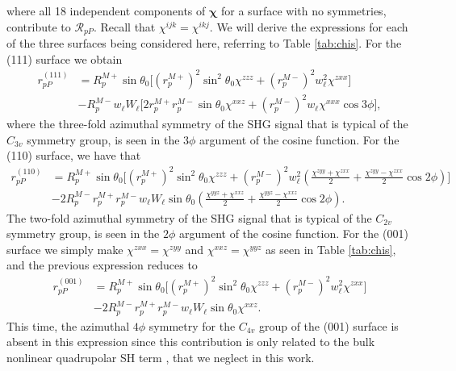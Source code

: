 where all 18 independent components of $\boldsymbol{\chi}$ for a surface with no
symmetries, contribute to $\mathcal{R}_{pP}$. Recall that $\chi^{ijk} =
\chi^{ikj}$. We will derive  the expressions for each of the three surfaces
being considered here, referring to Table \ref{tab:chis}. For the (111) surface we
obtain
\begin{equation}\label{eq:rpp111}
\begin{split}
r^{(111)}_{pP} &= 
R^{M+}_{p}\sin\theta_{0}
\Big[
  \left(r^{M+}_{p}\right)^{2}\sin^{2}\theta_{0}\chi^{zzz}
+ \left(r^{M-}_{p}\right)^{2}w^{2}_{\ell}\chi^{zxx}
\Big]\\
&- R^{M-}_{p}w_{\ell}W_{\ell}
\Big[
  2r^{M+}_{p}r^{M-}_{p}\sin\theta_{0}\chi^{xxz}
+ \left(r^{M-}_{p}\right)^{2}w_{\ell}\chi^{xxx}\cos3\phi
\Big],
\end{split}
\end{equation}
where the three-fold azimuthal symmetry of the SHG signal that is typical of the
$C_{3v}$ symmetry group, is seen in the $3\phi$ argument of the cosine function.
For the (110) surface, we have that
\begin{equation}\label{eq:rpp110}
\begin{split}
r^{(110)}_{pP} &= 
R^{M+}_{p}\sin\theta_{0}
\Bigg[
  \left(r^{M+}_{p}\right)^{2}\sin^{2}\theta_{0}\chi^{zzz}
+ \left(r^{M-}_{p}\right)^{2}w^{2}_{\ell}
\left(
\frac{\chi^{zyy} + \chi^{zxx}}{2} + \frac{\chi^{zyy} - \chi^{zxx}}{2}\cos2\phi 
\right) 
\Bigg]\\
&- 2R^{M-}_{p}r^{M+}_{p}r^{M-}_{p}w_{\ell}W_{\ell}\sin\theta_{0}
\left(
\frac{\chi^{yyz} + \chi^{xxz}}{2} + \frac{\chi^{yyz} - \chi^{xxz}}{2}\cos2\phi 
\right). 
\end{split}
\end{equation}
The two-fold azimuthal symmetry of the SHG signal that is typical of the
$C_{2v}$ symmetry group, is seen in the $2\phi$ argument of the cosine function.
For the (001) surface we simply make $\chi^{zxx}=\chi^{zyy}$ and
$\chi^{xxz}=\chi^{yyz}$ as seen in Table \ref{tab:chis}, and the previous
expression reduces to
\begin{equation}\label{rpp001}
\begin{split}
r^{(001)}_{pP} &= 
R^{M+}_{p}\sin\theta_{0}
\bigg[
  \left(r^{M+}_{p}\right)^{2}\sin^{2}\theta_{0}\chi^{zzz}
+ \left(r^{M-}_{p}\right)^{2}w^{2}_{\ell}\chi^{zxx}
\bigg]\\
&- 2R^{M-}_{p}r^{M+}_{p}r^{M-}_{p}w_{\ell}W_{\ell}\sin\theta_{0}\chi^{xxz}.
\end{split}
\end{equation}
This time, the azimuthal $4\phi$ symmetry for the $C_{4v}$ group of the (001)
surface is absent in this  expression since this contribution is only related to
the bulk nonlinear quadrupolar SH term \cite{sipePRB87}, that we neglect in this
work.


